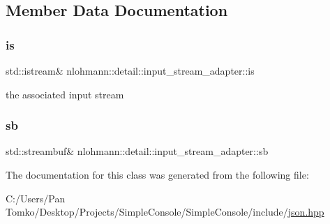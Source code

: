 \subsection{Member Data Documentation}
\mbox{\label{classnlohmann_1_1detail_1_1input__stream__adapter_ac3afada8eaf7d6cd2b475a3388d5e992}} 
\subsubsection{\texorpdfstring{is}{is}}
{\footnotesize\ttfamily std\+::istream\& nlohmann\+::detail\+::input\+\_\+stream\+\_\+adapter\+::is\hspace{0.3cm}{\ttfamily [private]}}



the associated input stream 

\mbox{\label{classnlohmann_1_1detail_1_1input__stream__adapter_addd96de4b5cbd9925ed5d8a0f0261143}} 
\subsubsection{\texorpdfstring{sb}{sb}}
{\footnotesize\ttfamily std\+::streambuf\& nlohmann\+::detail\+::input\+\_\+stream\+\_\+adapter\+::sb\hspace{0.3cm}{\ttfamily [private]}}



The documentation for this class was generated from the following file\+:\begin{DoxyCompactItemize}
\item 
C\+:/\+Users/\+Pan Tomko/\+Desktop/\+Projects/\+Simple\+Console/\+Simple\+Console/include/\mbox{\hyperlink{json_8hpp}{json.\+hpp}}\end{DoxyCompactItemize}

